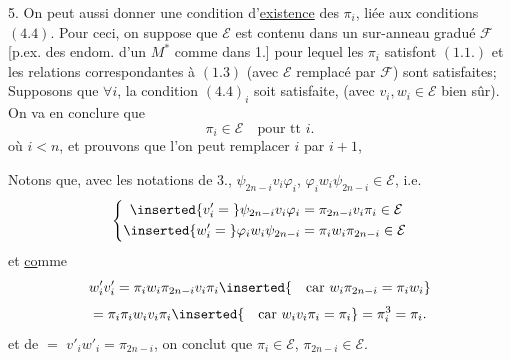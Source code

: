 5. On peut aussi donner une condition d'\uline{existence} des $\pi_i$, liée aux conditions $(4.4)$. Pour ceci, on suppose que $\mathcal E$ est contenu dans un sur-anneau gradué $\mathcal F$ [p.ex.  des endom. d'un $M^*$ comme dans 1.] pour lequel les $\pi_i$ satisfont $(1.1.)$ et les relations correspondantes à $(1.3)$ (avec $\mathcal E$ remplacé par $\mathcal F$) sont satisfaites;  Supposons que $\forall i$, la condition $(4.4)_i$ soit satisfaite, (avec $v_i,w_i\in\mathcal E$ bien sûr). On va en conclure que
\[
\pi_i\in\mathcal E\quad\text{pour tt }i.
\tag{5.1}
\]
 où $i<n$, et prouvons que l'on peut remplacer $i$ par $i+1$, 

Notons que, avec les notations de 3.,    $\psi_{2n-i}v_i\varphi_i$, $\varphi_iw_i\psi_{2n-i}\in\mathcal E$, i.e.
\[
\left\{\begin{aligned}
\inserted{v'_i={}}\psi_{2n-i}v_i\varphi_i&=\pi_{2n-i}v_i\pi_i\in\mathcal E\\
\inserted{w'_i={}}\varphi_iw_i\psi_{2n-i}&=\pi_iw_i\pi_{2n-i}\in\mathcal E
\end{aligned}\right.
\]
et \uline{co}mme 
\[
w'_iv'_i=\pi_iw_i\pi_{2n-i}v_i\pi_i
\inserted{\quad\text{car }w_i\pi_{2n-i}=\pi_iw_i}\]
\[
=\pi_i\pi_iw_iv_i\pi_i
\inserted{\quad\text{car }w_iv_i\pi_i=\pi_i}
=\pi_i^3=\pi_i.
\]
et de $=$  $v'_iw'_i=\pi_{2n-i}$, on conclut que $\pi_i\in\mathcal E$, $\pi_{2n-i}\in\mathcal E$.
